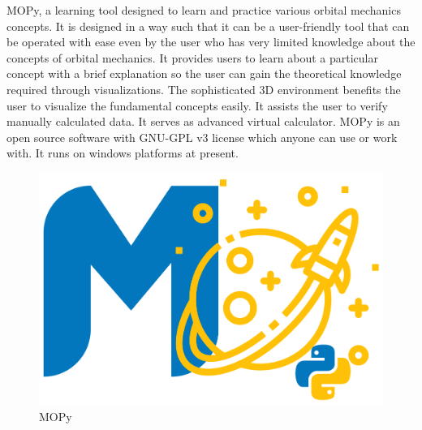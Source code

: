 \hspace{4em}MOPy, a learning tool designed to learn and practice various orbital mechanics concepts. It is designed in a way such that it can be a user-friendly tool that can be operated with ease even by the user who has very limited knowledge about the concepts of orbital mechanics. It provides users to learn about a particular concept with a brief explanation so the user can gain the theoretical knowledge required through visualizations. The sophisticated 3D environment benefits the user to visualize the fundamental concepts easily. It assists the user to verify manually calculated data. It serves as advanced virtual calculator. MOPy is an open source software with GNU-GPL v3 license\cite{lic} which anyone can use or work with. It runs on windows platforms at present.
\begin{figure}[H]
\centering
\includegraphics[scale=0.24]{images/mopy.png}
\caption{MOPy} \label{mopy}
\end{figure}
